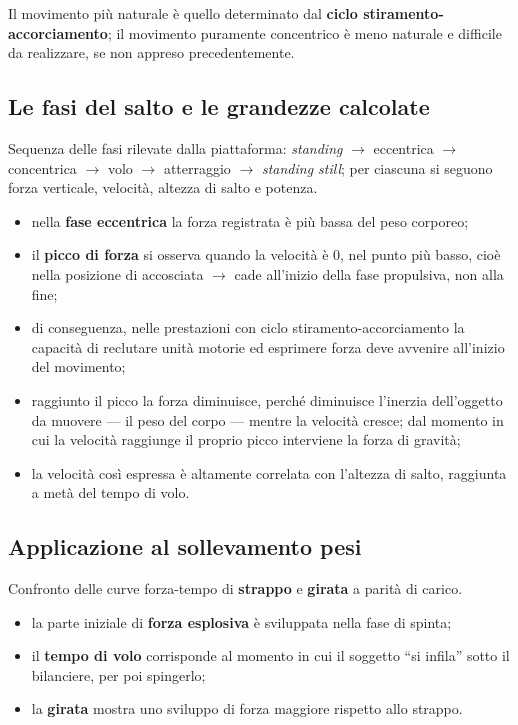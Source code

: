 Il movimento più naturale è quello determinato dal \textbf{ciclo stiramento-accorciamento}; il
movimento puramente concentrico è meno naturale e difficile da realizzare, se non appreso
precedentemente.

\subsection{Le fasi del salto e le grandezze calcolate}

Sequenza delle fasi rilevate dalla piattaforma: \textit{standing} $\rightarrow$ eccentrica
  $\rightarrow$ concentrica $\rightarrow$ volo $\rightarrow$ atterraggio $\rightarrow$
  \textit{standing still}; per ciascuna si seguono forza verticale, velocità, altezza di salto e
  potenza.

\begin{itemize}
  \item nella \textbf{fase eccentrica} la forza registrata è più bassa del peso corporeo;
  \item il \textbf{picco di forza} si osserva quando la velocità è $0$, nel punto più basso, cioè
    nella posizione di accosciata $\rightarrow$ cade all'inizio della fase propulsiva, non
    alla fine;
  \item di conseguenza, nelle prestazioni con ciclo stiramento-accorciamento la capacità di
    reclutare unità motorie ed esprimere forza deve avvenire all'inizio del movimento;
  \item raggiunto il picco la forza diminuisce, perché diminuisce l'inerzia dell'oggetto da muovere
    --- il peso del corpo --- mentre la velocità cresce; dal momento in cui la velocità raggiunge il
    proprio picco interviene la forza di gravità;
  \item la velocità così espressa è altamente correlata con l'altezza di salto, raggiunta a
    metà del tempo di volo.
\end{itemize}

\subsection{Applicazione al sollevamento pesi}

Confronto delle curve forza-tempo di \textbf{strappo} e \textbf{girata} a parità di carico.
\begin{itemize}
  \item la parte iniziale di \textbf{forza esplosiva} è sviluppata nella fase di spinta;
  \item il \textbf{tempo di volo} corrisponde al momento in cui il soggetto ``si infila'' sotto il
    bilanciere, per poi spingerlo;
  \item la \textbf{girata} mostra uno sviluppo di forza maggiore rispetto allo strappo.
\end{itemize}

